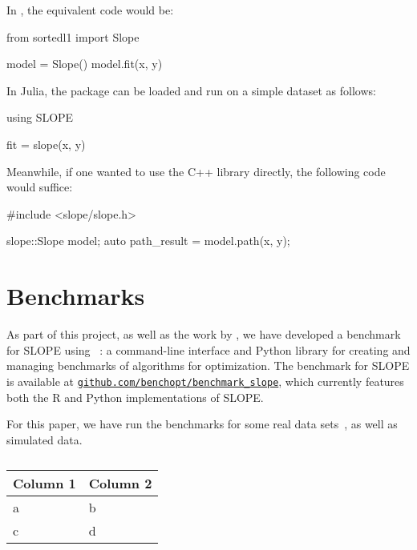 \documentclass[article]{jss}
\let\Cref\crtCref
\newcommand{\myurl}[1]{\href{https://#1}{\nolinkurl{#1}}}
\begin{document}
In , the equivalent code would be:
\begin{Code}
  from sortedl1 import Slope

  model = Slope()
  model.fit(x, y)
\end{Code}

In Julia, the package can be loaded and run on a simple dataset as follows:
\begin{Code}
  using SLOPE

  fit = slope(x, y)
\end{Code}

Meanwhile, if one wanted to use the C++ library directly, the following code
would suffice:
\begin{Code}
  #include <slope/slope.h>

  slope::Slope model;
  auto path_result = model.path(x, y);
\end{Code}

\section{Benchmarks}

As part of this project, as well as the work by \citet{larsson2023}, we have
developed a benchmark for SLOPE using ~\citep{moreau2022a}: a
command-line interface and Python library for creating and managing
benchmarks of algorithms for optimization. The benchmark for
SLOPE is available at \myurl{github.com/benchopt/benchmark\_slope}, which
currently features both the R and Python implementations of SLOPE.

For this paper, we have run the benchmarks for some real data sets~\Cref{tab:real-datasets},
as well as simulated data.

\begin{table}[htpb]
  \centering
  \caption{}
  \label{tab:real-datasets}
  \begin{tabular}{ll}
    \toprule
    Column 1 & Column 2 \\
    \midrule
    a        & b        \\
    c        & d        \\
    \bottomrule
  \end{tabular}
\end{table}



\newpage

\begin{appendix}

\end{appendix}
\end{document}
